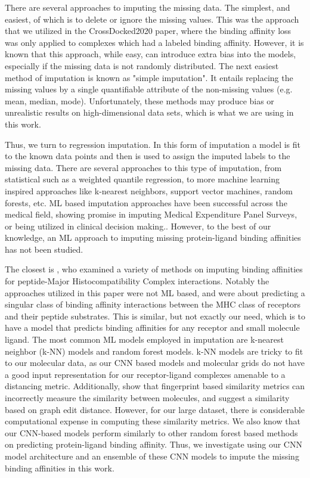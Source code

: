 \documentclass[journal=jmcmar,manuscript=article]{achemso}
\begin{document}
There are several approaches to imputing the missing data.
The simplest, and easiest, of which is to delete or ignore the missing values.
This was the approach that we utilized in the CrossDocked2020 paper, where the binding affinity loss was only applied to complexes which had a labeled binding affinity.
However, it is known that this approach, while easy, can introduce extra bias into the models, especially if the missing data is not randomly distributed.\cite{rev1support}
The next easiest method of imputation is known as "simple imputation".
It entails replacing the missing values by a single quantifiable attribute of the non-missing values (e.g. mean, median, mode).
Unfortunately, these methods may produce bias or unrealistic results on high-dimensional data sets, which is what we are using in this work. \cite{SICE}

Thus, we turn to regression imputation.
In this form of imputation a model is fit to the known data points and then is used to assign the imputed labels to the missing data.
There are several approaches to this type of imputation, from statistical such as a weighted quantile regression, to more machine learning inspired approaches like k-nearest neighbors, support vector machines, random forests, etc.\cite{rev1support,review2}
ML based imputation approaches have been successful across the medical field, showing promise in imputing Medical Expenditure Panel Surveys\cite{MLimpMedsurvey}, or being utilized in clinical decision making.\cite{MLclinicDecision}.
However, to the best of our knowledge, an ML approach to imputing missing protein-ligand binding affinities has not been studied.

The closest is \citet{peptideMHCimp}, who examined a variety of methods on imputing binding affinities for peptide-Major Histocompatibility Complex interactions.
Notably the approaches utilized in this paper were not ML based, and were about predicting a singular class of binding affinity interactions between the MHC class of receptors and their peptide substrates.\cite{peptideMHCimp}
This is similar, but not exactly our need, which is to have a model that predicts binding affinities for any receptor and small molecule ligand.
The most common ML models employed in imputation are k-nearest neighbor (k-NN) models and random forest models.\cite{review2}
k-NN models are tricky to fit to our molecular data, as our CNN based models and molecular grids do not have a good input representation for our receptor-ligand complexes amenable to a distancing metric.
Additionally, \citet{graphEditDist} show that fingerprint based similarity metrics can incorrectly measure the similarity between molecules, and suggest a similarity based on graph edit distance.
However, for our large dataset, there is considerable computational expense in computing these similarity metrics. 
We also know that our CNN-based models perform similarly to other random forest based methods on predicting protein-ligand binding affinity.\cite{crossdocked2020}
Thus, we investigate using our CNN model architecture and an ensemble of these CNN models to impute the missing binding affinities in this work.
\end{document}

